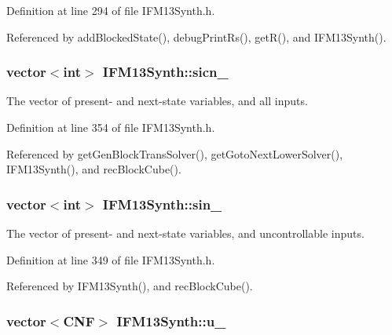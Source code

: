 Definition at line 294 of file I\-F\-M13\-Synth.\-h.



Referenced by add\-Blocked\-State(), debug\-Print\-Rs(), get\-R(), and I\-F\-M13\-Synth().

\hypertarget{classIFM13Synth_abb5b5fc0fe0db0e7aff06d22547e00bd}{
\subsubsection[{sicn\-\_\-}]{\setlength{\rightskip}{0pt plus 5cm}vector$<$int$>$ I\-F\-M13\-Synth\-::sicn\-\_\-\hspace{0.3cm}{\ttfamily [protected]}}}\label{classIFM13Synth_abb5b5fc0fe0db0e7aff06d22547e00bd}


The vector of present-\/ and next-\/state variables, and all inputs. 



Definition at line 354 of file I\-F\-M13\-Synth.\-h.



Referenced by get\-Gen\-Block\-Trans\-Solver(), get\-Goto\-Next\-Lower\-Solver(), I\-F\-M13\-Synth(), and rec\-Block\-Cube().

\hypertarget{classIFM13Synth_ac35a6617ca45b2aa1823c99ae7c984a4}{
\subsubsection[{sin\-\_\-}]{\setlength{\rightskip}{0pt plus 5cm}vector$<$int$>$ I\-F\-M13\-Synth\-::sin\-\_\-\hspace{0.3cm}{\ttfamily [protected]}}}\label{classIFM13Synth_ac35a6617ca45b2aa1823c99ae7c984a4}


The vector of present-\/ and next-\/state variables, and uncontrollable inputs. 



Definition at line 349 of file I\-F\-M13\-Synth.\-h.



Referenced by I\-F\-M13\-Synth(), and rec\-Block\-Cube().

\hypertarget{classIFM13Synth_a493a9f0a3f2880597a89d48766706099}{
\subsubsection[{u\-\_\-}]{\setlength{\rightskip}{0pt plus 5cm}vector$<${\bf C\-N\-F}$>$ I\-F\-M13\-Synth\-::u\-\_\-\hspace{0.3cm}{\ttfamily [protected]}}}\label{classIFM13Synth_a493a9f0a3f2880597a89d48766706099}


